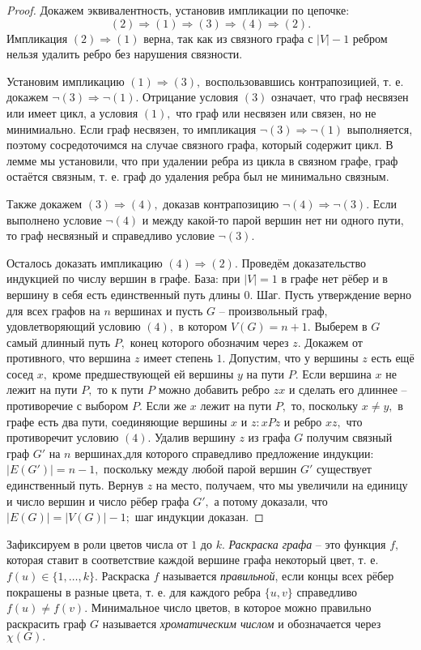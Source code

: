 \begin{proof}
    Докажем эквивалентность, установив импликации по цепочке:
    $$(2) \Longrightarrow (1) \Longrightarrow (3) \Longrightarrow (4) \Longrightarrow (2).$$ 
    Импликация $(2) \Longrightarrow (1)$ верна, так как из связного графа с $|V| - 1$ ребром нельзя удалить ребро без нарушения связности. 
    
    Установим импликацию $(1) \Longrightarrow (3),$ воспользовавшись контрапозицией, т. е. докажем $\neg (3) \Longrightarrow \neg(1).$ Отрицание условия $(3)$ означает, что граф несвязен или имеет цикл, а условия $(1),$ что граф или несвязен или связен, но не минимиально. Если граф несвязен, то импликация $\neg (3) \Longrightarrow \neg (1)$ выполняется, поэтому сосредоточимся на случае связного графа, который содержит цикл. В лемме мы установили, что при удалении ребра из цикла в связном графе, граф остаётся связным, т. е. граф до удаления ребра был не минимально связным. 
    
    Также докажем $(3) \Longrightarrow (4),$ доказав контрапозицию $\neg (4) \Longrightarrow \neg (3).$ Если выполнено условие $\neg (4)$ и между какой-то парой вершин нет ни одного пути, то граф несвязный и справедливо условие $\neg (3).$

    Осталось доказать импликацию $(4) \Longrightarrow (2).$ Проведём доказательство индукцией по числу вершин в графе. База: при $|V| = 1$ в графе нет рёбер и в вершину в себя есть единственный путь длины $0.$ Шаг. Пусть утверждение верно для всех графов на $n$ вершинах и пусть $G$ -- произвольный граф, удовлетворяющий условию $(4),$ в котором $V(G) = n + 1.$ Выберем в $G$ самый длинный путь $P,$ конец которого обозначим через $z.$ Докажем от противного, что вершина $z$ имеет степень $1.$ Допустим, что у вершины $z$ есть ещё сосед $x,$ кроме предшествующей ей вершины $y$ на пути $P.$ Если вершина $x$ не лежит на пути $P,$ то к пути $P$ можно добавить ребро $zx$ и сделать его длиннее -- противоречие с выбором $P.$ Если же $x$ лежит на пути $P,$ то, поскольку $x \neq y,$ в графе есть два пути, соединяющие вершины $x$ и $z: xP z$ и ребро $xz,$ что противоречит условию $(4).$ Удалив вершину $z$ из графа $G$ получим связный граф $G'$ на $n$ вершинах,для которого справедливо предложение индукции: $|E(G′)| = n - 1,$ поскольку между любой парой вершин $G'$ существует единственный путь. Вернув $z$ на место, получаем, что мы увеличили на единицу и число вершин и число рёбер графа $G′,$ а потому доказали, что $|E(G)| = |V(G)| - 1;$ шаг индукции доказан.
\end{proof}


\begin{definition}
    Зафиксируем в роли цветов числа от $1$ до $k.$ \textit{Раскраска графа} -- это функция $f,$ которая ставит в соответствие каждой вершине графа некоторый цвет, т. е. $f(u) \in \{1, \dots , k\}.$ Раскраска $f$ называется \textit{правильной}, если концы всех рёбер покрашены в разные цвета, т. е. для каждого ребра $\{u, v\}$ справедливо $f(u) \neq f(v).$ Минимальное число цветов, в которое можно правильно раскрасить граф $G$ называется \textit{хроматическим числом} и обозначается через $\chi(G).$
\end{definition}